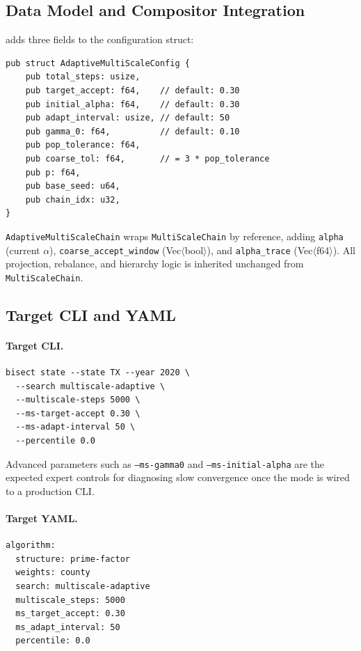 \subsection{Data Model and Compositor Integration}

\ams{} adds three fields to the \ms{} configuration struct:

\begin{verbatim}
pub struct AdaptiveMultiScaleConfig {
    pub total_steps: usize,
    pub target_accept: f64,    // default: 0.30
    pub initial_alpha: f64,    // default: 0.30
    pub adapt_interval: usize, // default: 50
    pub gamma_0: f64,          // default: 0.10
    pub pop_tolerance: f64,
    pub coarse_tol: f64,       // = 3 * pop_tolerance
    pub p: f64,
    pub base_seed: u64,
    pub chain_idx: u32,
}
\end{verbatim}

\noindent
\texttt{AdaptiveMultiScaleChain} wraps \texttt{MultiScaleChain} by reference,
adding \texttt{alpha} (current $\alpha$), \texttt{coarse\_accept\_window}
(Vec$\langle$bool$\rangle$), and \texttt{alpha\_trace} (Vec$\langle$f64$\rangle$).
All projection, rebalance, and hierarchy logic is inherited unchanged from
\texttt{MultiScaleChain}.

\subsection{Target CLI and YAML}

\paragraph{Target CLI.}
\begin{verbatim}
bisect state --state TX --year 2020 \
  --search multiscale-adaptive \
  --multiscale-steps 5000 \
  --ms-target-accept 0.30 \
  --ms-adapt-interval 50 \
  --percentile 0.0
\end{verbatim}

Advanced parameters such as \texttt{--ms-gamma0} and
\texttt{--ms-initial-alpha} are the expected expert controls for diagnosing slow
convergence once the mode is wired to a production CLI.

\paragraph{Target YAML.}
\begin{verbatim}
algorithm:
  structure: prime-factor
  weights: county
  search: multiscale-adaptive
  multiscale_steps: 5000
  ms_target_accept: 0.30
  ms_adapt_interval: 50
  percentile: 0.0
\end{verbatim}

